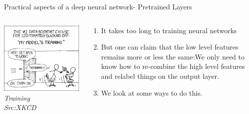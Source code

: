\begin{frame}{Practical aspects of a deep neural network- Pretrained Layers}
	\begin{columns}[T]
        \begin{column}{0.4\textwidth}
        	\includegraphics[width=\textwidth]{images/training.png}
			\tiny{\textit{Training\\ Src:XKCD}}
        \end{column}
	    \begin{column}{0.6\textwidth} 
			\begin{enumerate}[$\bullet$]
				\item It takes too long to training neural networks\pause
				\item But one can claim that the low level features remains more or less the same:\pause  We only need to know how to re-combine the high level features and relabel things on the output layer.\pause
				\item We look at some ways to do this. 
			\end{enumerate}
    	\end{column}
    \end{columns}
\end{frame}

